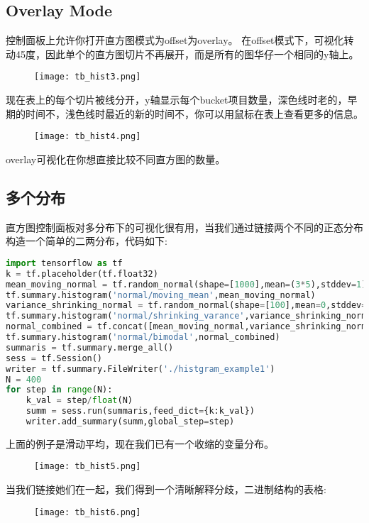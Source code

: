 \subsection{Overlay Mode}
控制面板上允许你打开直方图模式为offset为overlay。
在offset模式下，可视化转动45度，因此单个的直方图切片不再展开，而是所有的图华仔一个相同的y轴上。
\begin{center}
\begin{figure}[H]
\texttt{[image: tb\_hist3.png]}
\end{figure}
\end{center}
现在表上的每个切片被线分开，y轴显示每个bucket项目数量，深色线时老的，早期的时间不，浅色线时最近的新的时间不，你可以用鼠标在表上查看更多的信息。
\begin{center}
\begin{figure}[H]
\texttt{[image: tb\_hist4.png]}
\end{figure}
\end{center}

overlay可视化在你想直接比较不同直方图的数量。
\subsection{多个分布}
直方图控制面板对多分布下的可视化很有用，当我们通过链接两个不同的正态分布构造一个简单的二两分布，代码如下:
\begin{lstlisting}[language=Python]
import tensorflow as tf
k = tf.placeholder(tf.float32)
mean_moving_normal = tf.random_normal(shape=[1000],mean=(3*5),stddev=1)
tf.summary.histogram('normal/moving_mean',mean_moving_normal)
variance_shrinking_normal = tf.random_normal(shape=[100],mean=0,stddev=1-(k))
tf.summary.histogram('normal/shrinking_varance',variance_shrinking_normal)
normal_combined = tf.concat([mean_moving_normal,variance_shrinking_normal],0)
tf.summary.histogram('normal/bimodal',normal_combined)
summaris = tf.summary.merge_all()
sess = tf.Session()
writer = tf.summary.FileWriter('./histgram_example1')
N = 400
for step in range(N):
    k_val = step/float(N)
    summ = sess.run(summaris,feed_dict={k:k_val})
    writer.add_summary(summ,global_step=step)
\end{lstlisting}
上面的例子是滑动平均，现在我们已有一个收缩的变量分布。
\begin{center}
\begin{figure}[H]
\texttt{[image: tb\_hist5.png]}
\end{figure}
\end{center}
当我们链接她们在一起，我们得到一个清晰解释分歧，二进制结构的表格:
\begin{center}
\begin{figure}[H]
\texttt{[image: tb\_hist6.png]}
\end{figure}
\end{center}
